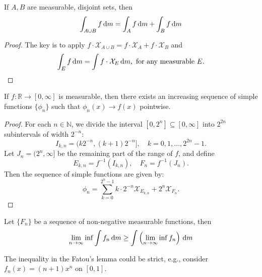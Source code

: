 \begin{proposition}
If $A,B$ are measurable, disjoint sets, then
\[
\int_{A\cup B}f\,\mathrm{d} m = \int_Af\,\mathrm{d} m+\int_Bf\,\mathrm{d} m
\]
\end{proposition}
\begin{proof}
The key is to apply $f\cdot\mathcal{X}_{A\cup B}=f\cdot\mathcal{X}_A+f\cdot\mathcal{X}_B$ and 
\[
\int_Ef\,\mathrm{d} m=\int f\cdot\mathcal{X}_E\,\mathrm{d} m,\text{ for any measurable $E$}.
\]
\end{proof}

\begin{proposition}
If $f:\mathbb{R}\to[0,\infty]$ is measurable, then there exists an increasing sequence of simple functions $\{\phi_n\}$ such that $\phi_n(x)\to f(x)$ pointwise.
\end{proposition}

\begin{proof}
For each $n\in\mathbb{N}$, we divide the interval $[0,2^n]\subseteq[0,\infty]$ into $2^{2n}$ subintervals of width $2^{-n}$:
\[
I_{k,n}=(k2^{-n},(k+1)2^{-n}],\quad
k=0,1,\dots,2^{2n}-1.
\]
Let $J_n=(2^n,\infty]$ be the remaining part of the range of $f$, and define
\[
E_{k,n} = f^{-1}(I_{k,n}),\quad
F_n=f^{-1}(J_n).
\]
Then the sequence of simple functions are given by:
\[
\phi_n = \sum_{k=0}^{2^n-1}k\cdot 2^{-n}\mathcal{X}_{E_{k,n}}+2^n\mathcal{X}_{F_n}.
\]
\end{proof}

\begin{proposition}
Let $\{F_n\}$ be a sequence of non-negative measurable functions, then
\[
\lim_{n\to\infty}\inf\int f_n\,\mathrm{d} m\ge \int\left(\lim_{n\to\infty}\inf f_n\right)\,\mathrm{d} m
\]
\end{proposition}


\begin{remark}
The inequality in the Fatou's lemma could be strict, e.g., consider $f_n(x)=(n+1)x^n$ on $[0,1]$.
\end{remark}














